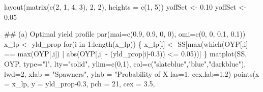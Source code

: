 \documentclass[
  11pt,
]{article}
\newenvironment{Shaded}{}{}
\newcommand{\CommentTok}[1]{\textcolor[rgb]{0.00,0.50,0.00}{#1}}
\newcommand{\ControlFlowTok}[1]{\textcolor[rgb]{0.00,0.00,1.00}{#1}}
\newcommand{\DataTypeTok}[1]{#1}
\newcommand{\DecValTok}[1]{#1}
\newcommand{\FloatTok}[1]{#1}
\newcommand{\KeywordTok}[1]{\textcolor[rgb]{0.00,0.00,1.00}{#1}}
\newcommand{\NormalTok}[1]{#1}
\newcommand{\OperatorTok}[1]{#1}
\newcommand{\StringTok}[1]{\textcolor[rgb]{0.00,0.50,0.50}{#1}}
\begin{document}
\begin{Shaded}
\begin{Highlighting}[]
\KeywordTok{layout}\NormalTok{(}\KeywordTok{matrix}\NormalTok{(}\KeywordTok{c}\NormalTok{(}\DecValTok{2}\NormalTok{, }\DecValTok{1}\NormalTok{, }\DecValTok{4}\NormalTok{, }\DecValTok{3}\NormalTok{), }\DecValTok{2}\NormalTok{, }\DecValTok{2}\NormalTok{), }\DataTypeTok{heights =} \KeywordTok{c}\NormalTok{(}\DecValTok{1}\NormalTok{, }\DecValTok{5}\NormalTok{))}
\NormalTok{yoffSet <-}\StringTok{ }\FloatTok{0.10}
\NormalTok{yoffSet <-}\StringTok{ }\FloatTok{0.05}

\CommentTok{## (a) Optimal yield profile}
\KeywordTok{par}\NormalTok{(}\DataTypeTok{mai=}\KeywordTok{c}\NormalTok{(}\FloatTok{0.9}\NormalTok{, }\FloatTok{0.9}\NormalTok{, }\DecValTok{0}\NormalTok{, }\DecValTok{0}\NormalTok{), }\DataTypeTok{omi=}\KeywordTok{c}\NormalTok{(}\DecValTok{0}\NormalTok{, }\DecValTok{0}\NormalTok{, }\FloatTok{0.1}\NormalTok{, }\FloatTok{0.1}\NormalTok{))}
\NormalTok{x_lp <-}\StringTok{ }\NormalTok{yld_prop}
\ControlFlowTok{for}\NormalTok{(i }\ControlFlowTok{in} \DecValTok{1}\OperatorTok{:}\KeywordTok{length}\NormalTok{(x_lp)) \{}
\NormalTok{    x_lp[i] <-}\StringTok{ }\NormalTok{SS[}\KeywordTok{max}\NormalTok{(}\KeywordTok{which}\NormalTok{(OYP[,i] }\OperatorTok{==}\StringTok{ }\KeywordTok{max}\NormalTok{(OYP[,i])}
                            \OperatorTok{|}\StringTok{ }\KeywordTok{abs}\NormalTok{(OYP[,i] }\OperatorTok{-}\StringTok{ }\NormalTok{(yld_prop[i]}\OperatorTok{-}\FloatTok{0.3}\NormalTok{)) }\OperatorTok{<=}\StringTok{ }\FloatTok{0.05}\NormalTok{))]}
\NormalTok{\}}
\KeywordTok{matplot}\NormalTok{(SS, OYP, }\DataTypeTok{type=}\StringTok{"l"}\NormalTok{, }\DataTypeTok{lty=}\StringTok{"solid"}\NormalTok{,  }\DataTypeTok{ylim=}\KeywordTok{c}\NormalTok{(}\DecValTok{0}\NormalTok{,}\DecValTok{1}\NormalTok{),}
        \DataTypeTok{col=}\KeywordTok{c}\NormalTok{(}\StringTok{"slateblue"}\NormalTok{,}\StringTok{"blue"}\NormalTok{,}\StringTok{"darkblue"}\NormalTok{), }\DataTypeTok{lwd=}\DecValTok{2}\NormalTok{,}
        \DataTypeTok{xlab =} \StringTok{"Spawners"}\NormalTok{, }\DataTypeTok{ylab =} \StringTok{"Probability of X%
        \DataTypeTok{las=}\DecValTok{1}\NormalTok{, }\DataTypeTok{cex.lab=}\FloatTok{1.2}\NormalTok{)}
\KeywordTok{points}\NormalTok{(}\DataTypeTok{x =}\NormalTok{ x_lp, }\DataTypeTok{y =}\NormalTok{ yld_prop}\FloatTok{-0.3}\NormalTok{,}
       \DataTypeTok{pch =} \DecValTok{21}\NormalTok{, }\DataTypeTok{cex =} \FloatTok{3.5}\NormalTok{,}
}
\end{Highlighting}
\end{Shaded}
\end{document}
